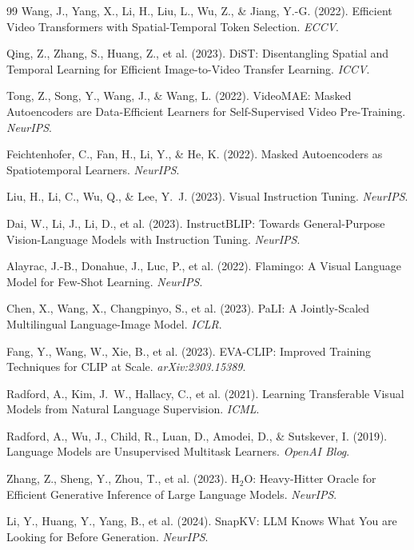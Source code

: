 \documentclass{article}
\begin{document}
{\begin{thebibliography}{99}
Wang, J., Yang, X., Li, H., Liu, L., Wu, Z., \& Jiang, Y.-G. (2022). Efficient Video Transformers with Spatial-Temporal Token Selection. \emph{ECCV}.

Qing, Z., Zhang, S., Huang, Z., et al. (2023). DiST: Disentangling Spatial and Temporal Learning for Efficient Image-to-Video Transfer Learning. \emph{ICCV}.

Tong, Z., Song, Y., Wang, J., \& Wang, L. (2022). VideoMAE: Masked Autoencoders are Data-Efficient Learners for Self-Supervised Video Pre-Training. \emph{NeurIPS}.

Feichtenhofer, C., Fan, H., Li, Y., \& He, K. (2022). Masked Autoencoders as Spatiotemporal Learners. \emph{NeurIPS}.

Liu, H., Li, C., Wu, Q., \& Lee, Y.~J. (2023). Visual Instruction Tuning. \emph{NeurIPS}.

Dai, W., Li, J., Li, D., et al. (2023). InstructBLIP: Towards General-Purpose Vision-Language Models with Instruction Tuning. \emph{NeurIPS}.

Alayrac, J.-B., Donahue, J., Luc, P., et al. (2022). Flamingo: A Visual Language Model for Few-Shot Learning. \emph{NeurIPS}.

Chen, X., Wang, X., Changpinyo, S., et al. (2023). PaLI: A Jointly-Scaled Multilingual Language-Image Model. \emph{ICLR}.

Fang, Y., Wang, W., Xie, B., et al. (2023). EVA-CLIP: Improved Training Techniques for CLIP at Scale. \emph{arXiv:2303.15389}.

Radford, A., Kim, J.~W., Hallacy, C., et al. (2021). Learning Transferable Visual Models from Natural Language Supervision. \emph{ICML}.

Radford, A., Wu, J., Child, R., Luan, D., Amodei, D., \& Sutskever, I. (2019). Language Models are Unsupervised Multitask Learners. \emph{OpenAI Blog}.

Zhang, Z., Sheng, Y., Zhou, T., et al. (2023). H$_2$O: Heavy-Hitter Oracle for Efficient Generative Inference of Large Language Models. \emph{NeurIPS}.

Li, Y., Huang, Y., Yang, B., et al. (2024). SnapKV: LLM Knows What You are Looking for Before Generation. \emph{NeurIPS}.


\end{thebibliography}}
\end{document}
